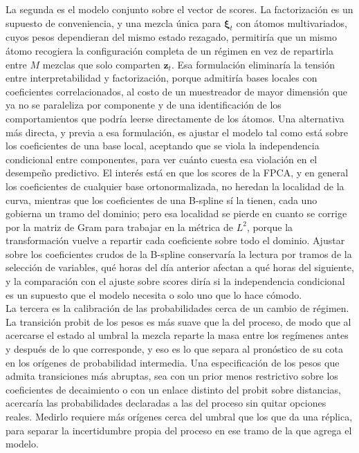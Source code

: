 La segunda es el modelo conjunto sobre el vector de scores. La factorización es un supuesto de conveniencia, y una mezcla única para $\boldsymbol{\xi}_t$ con átomos multivariados, cuyos pesos dependieran del mismo estado rezagado, permitiría que un mismo átomo recogiera la configuración completa de un régimen en vez de repartirla entre $M$ mezclas que solo comparten $\mathbf{z}_t$. Esa formulación eliminaría la tensión entre interpretabilidad y factorización, porque admitiría bases locales con coeficientes correlacionados, al costo de un muestreador de mayor dimensión que ya no se paraleliza por componente y de una identificación de los comportamientos que podría leerse directamente de los átomos. Una alternativa más directa, y previa a esa formulación, es ajustar el modelo tal como está sobre los coeficientes de una base local, aceptando que se viola la independencia condicional entre componentes, para ver cuánto cuesta esa violación en el desempeño predictivo. El interés está en que los scores de la FPCA, y en general los coeficientes de cualquier base ortonormalizada, no heredan la localidad de la curva, mientras que los coeficientes de una B-spline sí la tienen, cada uno gobierna un tramo del dominio; pero esa localidad se pierde en cuanto se corrige por la matriz de Gram para trabajar en la métrica de $L^2$, porque la transformación vuelve a repartir cada coeficiente sobre todo el dominio. Ajustar sobre los coeficientes crudos de la B-spline conservaría la lectura por tramos de la selección de variables, qué horas del día anterior afectan a qué horas del siguiente, y la comparación con el ajuste sobre scores diría si la independencia condicional es un supuesto que el modelo necesita o solo uno que lo hace cómodo.\\

La tercera es la calibración de las probabilidades cerca de un cambio de régimen. La transición probit de los pesos es más suave que la del proceso, de modo que al acercarse el estado al umbral la mezcla reparte la masa entre los regímenes antes y después de lo que corresponde, y eso es lo que separa al pronóstico de su cota en los orígenes de probabilidad intermedia. Una especificación de los pesos que admita transiciones más abruptas, sea con un prior menos restrictivo sobre los coeficientes de decaimiento o con un enlace distinto del probit sobre distancias, acercaría las probabilidades declaradas a las del proceso sin quitar opciones reales. Medirlo requiere más orígenes cerca del umbral que los que da una réplica, para separar la incertidumbre propia del proceso en ese tramo de la que agrega el modelo.\\


